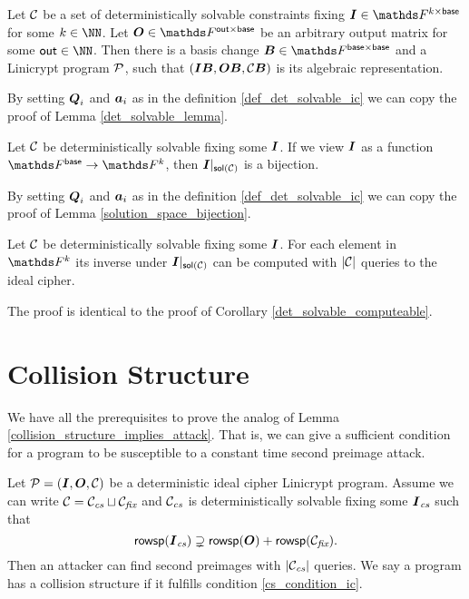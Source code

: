 \begin{lemma}
\label{det_solvable_lemma_ic}
    Let $\C$ be a set of deterministically solvable constraints fixing $\Inp \in \F^{k \times \base}$ for some $k \in \NN$.
    Let $\O \in \F^{\out \times \base}$ be an arbitrary output matrix for some $\out \in \NN$.
    Then there is a basis change $\B \in \F^{\base \times \base}$
    and a Linicrypt program $\P$,
    such that $(\Inp \B, \O \B, \C \B)$ is its algebraic representation.
\end{lemma}

\begin{sketch}
    By setting $\Q_i$ and $\va_i$ as in the definition \ref{def_det_solvable_ic} we can copy the proof of Lemma \ref{det_solvable_lemma}.
\end{sketch}

\begin{lemma}
\label{solution_space_bijection_ic}
    Let $\C$ be deterministically solvable fixing some $\I$.
    If we view $\I$ as a function $\Fsp \to \F^k$,
    then $\I|_{\sol(\C)}$ is a bijection.
\end{lemma}

\begin{sketch}
    By setting $\Q_i$ and $\va_i$ as in the definition \ref{def_det_solvable_ic} we can copy the proof of Lemma \ref{solution_space_bijection}.
\end{sketch}

\begin{corollary}
\label{det_solvable_computeable_ic}
    Let $\C$ be deterministically solvable fixing some $\I$.
    For each element in $\F^k$ its inverse under $\I|_{\sol(\C)}$ can be computed with $|\C|$ queries to the ideal cipher.
\end{corollary}

\begin{sketch}
    The proof is identical to the proof of Corollary \ref{det_solvable_computeable}.
\end{sketch}

\section{Collision Structure}

We have all the prerequisites to prove the analog of Lemma \ref{collision_structure_implies_attack}.
That is, we can give a sufficient condition for a program to be susceptible to a constant time second preimage attack.

\begin{prop}
\label{collision_structure_implies_attack_ic}
    Let $\P = (\I, \O, \C)$ be a deterministic ideal cipher Linicrypt program.
    Assume we can write $\C = \Ccs \sqcup \Cfix$ and
    $\Ccs$ is deterministically solvable fixing some $\Ics$ such that
    \begin{equation}
    \label{cs_condition_ic}
        \rowsp(\Ics) \supsetneq \rowsp(\O) + \rowsp(\Cfix).
    \end{equation}
    Then an attacker can find second preimages with $|\Ccs|$ queries.
    We say a program has a collision structure if it fulfills condition \eqref{cs_condition_ic}.
\end{prop}

